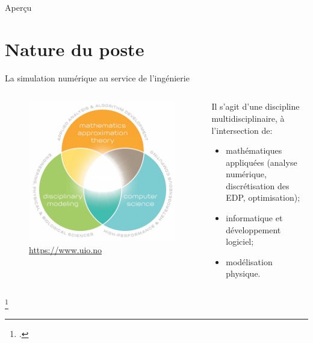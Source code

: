 \documentclass[aspectratio=169, french]{beamer}
\begin{document}
	
	
\begin{frame}[plain]
	
	
	
\end{frame}

	
	
\begin{frame}{Aperçu}
		
		\tableofcontents
		
\end{frame}

	
\section{Nature du poste}

\begin{frame}{La simulation numérique au service de l'ingénierie}
	
	\begin{columns}
		\begin{column}{.45\textwidth}
		\begin{figure}
			\includegraphics[width=.9\textwidth]{cse.jpg}
			\caption{\href{https://www.uio.no/english/studies/programmes/computational-science-master/why-choose/}{https://www.uio.no}}
		\end{figure}	
		\end{column}
		\begin{column}{.5\textwidth}
		Il s'agit d'une discipline multidisciplinaire, à l'intersection de\footnotemark :
		\begin{itemize}
			\item mathématiques appliquées (analyse numérique, discrétisation des EDP, optimisation);
			\item informatique et développement logiciel;
			\item modélisation physique.
		\end{itemize}
		
		\end{column}
	\end{columns}	
	\footcitetext{ulrich2018cse}
\end{frame}
\end{document}
